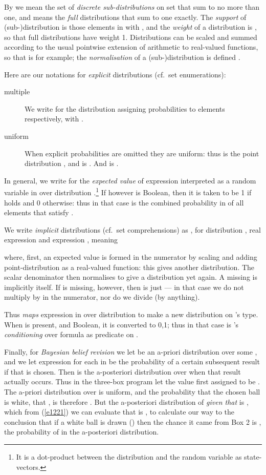 \documentclass[runningheads]{llncs}
\newcommand\Eqn[1] {(\ref{#1})}
\begin{document}
By  we mean the set of \emph{discrete sub-distributions} on set  that sum to no more than one, and  means the \emph{full} distributions that sum to one exactly. The \emph{support}  of (sub-)distribution  is those elements  in  with , and the \emph{weight}  of a distribution is , so that full distributions have weight 1. Distributions can be scaled and summed according to the usual pointwise extension of arithmetic to real-valued functions, so that  is  for example; the \emph{normalisation} of a (sub-)distribution  is defined .

Here are our notations for \emph{explicit} distributions (cf.\ set enumerations):
\begin{description}
\item[multiple] We write  for the distribution assigning probabilities  to elements  respectively, with .
\item[uniform] When explicit probabilities are omitted they are uniform: thus  is the point distribution , and  is . And  is .
\end{description}

In general, we write  for the \emph{expected value}  of expression  interpreted as a random variable in  over distribution .\footnote{It is a dot-product between the distribution and the random variable as state-vectors.}
If however  is Boolean, then it is taken to be 1 if  holds and 0 otherwise: thus in that case  is the combined probability in  of all elements  that satisfy .

We write \emph{implicit} distributions (cf.\ set comprehensions) as , for distribution , real expression  and expression , meaning

where, first, an expected value is formed in the numerator by scaling and adding point-distribution  as a real-valued function: this gives another distribution. The scalar denominator then normalises to give a distribution yet again. A missing  is implicitly  itself. If  is missing, however, then  is just  --- in that case we do not multiply by  in the numerator, nor do we divide (by anything).

Thus  \emph{maps} expression  in  over distribution  to make a new distribution on 's type.  When  is present, and Boolean, it is converted to 0,1; thus in that case  is 's \emph{conditioning} over formula  as predicate on .

Finally, for \emph{Bayesian belief revision} we let  be an a-priori distribution over some , and we let expression  for each  in  be the probability of a certain subsequent result if that  is chosen. Then  is the a-posteriori distribution over  when that result actually occurs. Thus in the three-box program  let the value first assigned to  be . The a-priori distribution over  is uniform, and the probability that the chosen ball is white, that , is therefore . But the a-posteriori distribution of  \emph{given that } is , which from \Eqn{e1221} we can evaluate
{\small}
that is , to calculate our way to the conclusion that if a white ball is drawn () then the chance it came from Box 2 is , the probability of  in the a-posteriori distribution.
\end{document}
